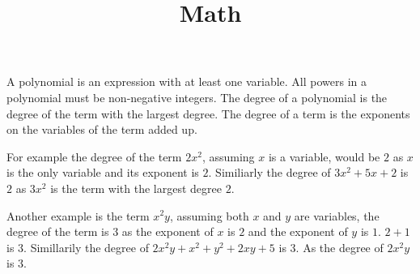 \documentclass[12pt, letterpaper, twoside]{article}
\title{Math}
\begin{document}
	
	\maketitle

A polynomial is an expression with at least one variable. All powers in a polynomial must be non-negative integers. The degree of a polynomial is the degree of the term with the largest degree. The degree of a term is the exponents on the variables of the term added up.\par
For example the degree of the term $2x^2$, assuming $x$ is a variable, would be $2$ as $x$ is the only variable and its exponent is $2$. Similiarly the degree of $3x^2 + 5x +2$ is $2$ as $3x^2$ is the term with the largest degree $2$. \par
Another example is the term $x^2y$, assuming both $x$ and $y$ are variables, the degree of the term is $3$ as the exponent of $x$ is $2$ and the exponent of $y$ is $1$. $2 + 1$ is $3$. Simillarily the degree of $2x^2y + x^2 + y^2 + 2xy + 5$ is $3$. As the degree of $2x^2y$ is $3$. 

	
\end{document}
